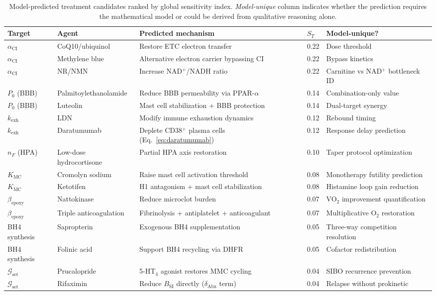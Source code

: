 \begin{table}[htbp]
\centering
\caption{Model-predicted treatment candidates ranked by global sensitivity index. \emph{Model-unique} column indicates whether the prediction requires the mathematical model or could be derived from qualitative reasoning alone.}
\label{tab:treatment-predictions}
\small
\begin{tabular}{p{2.5cm}p{2.5cm}p{3.5cm}p{1.5cm}p{2cm}}
\toprule
\textbf{Target} & \textbf{Agent} & \textbf{Predicted mechanism} & \textbf{$S_T$} & \textbf{Model-unique?} \\
\midrule
$\alpha_{\text{CI}}$ & CoQ10/ubiquinol & Restore ETC electron transfer & 0.22 & Dose threshold \\
$\alpha_{\text{CI}}$ & Methylene blue & Alternative electron carrier bypassing CI & 0.22 & Bypass kinetics \\
$\alpha_{\text{CI}}$ & NR/NMN & Increase NAD$^+$/NADH ratio & 0.22 & Carnitine vs NAD$^+$ bottleneck ID \\
$P_0$ (BBB) & Palmitoylethanolamide & Reduce BBB permeability via PPAR-$\alpha$ & 0.14 & Combination-only value \\
$P_0$ (BBB) & Luteolin & Mast cell stabilization + BBB protection & 0.14 & Dual-target synergy \\
$k_{\text{exh}}$ & LDN & Modify immune exhaustion dynamics & 0.12 & Rebound timing \\
$k_{\text{exh}}$ & Daratumumab & Deplete CD38$^+$ plasma cells (Eq.~\ref{eq:daratumumab}) & 0.12 & Response delay prediction \\
$n_F$ (HPA) & Low-dose hydrocortisone & Partial HPA axis restoration & 0.10 & Taper protocol optimization \\
$K_{\text{MC}}$ & Cromolyn sodium & Raise mast cell activation threshold & 0.08 & Monotherapy futility prediction \\
$K_{\text{MC}}$ & Ketotifen & H1 antagonism + mast cell stabilization & 0.08 & Histamine loop gain reduction \\
$\beta_{\text{epoxy}}$ & Nattokinase & Reduce microclot burden & 0.07 & VO$_2$ improvement quantification \\
$\beta_{\text{epoxy}}$ & Triple anticoagulation & Fibrinolysis + antiplatelet + anticoagulant & 0.07 & Multiplicative O$_2$ restoration \\
BH4 synthesis & Sapropterin & Exogenous BH4 supplementation & 0.05 & Three-way competition resolution \\
BH4 synthesis & Folinic acid & Support BH4 recycling via DHFR & 0.05 & Cofactor redistribution \\
$\mathcal{G}_{\text{set}}$ & Prucalopride & 5-HT$_4$ agonist restores MMC cycling & 0.04 & SIBO recurrence prevention \\
$\mathcal{G}_{\text{set}}$ & Rifaximin & Reduce $B_{\text{SI}}$ directly ($\delta_{\text{Abx}}$ term) & 0.04 & Relapse without prokinetic \\
\bottomrule
\end{tabular}
\end{table}

